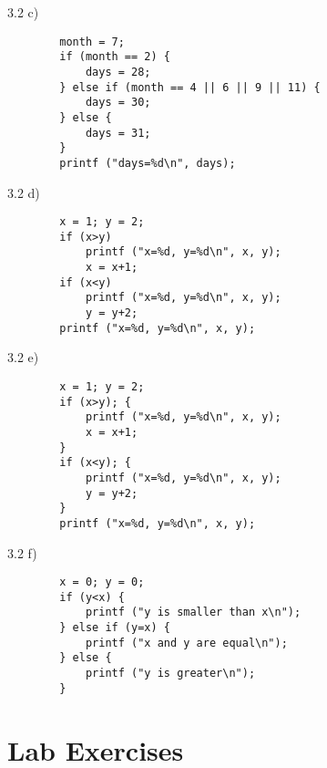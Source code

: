 \documentclass{beamer}
\begin{document}
\begin{frame}[fragile]{3.2 c)}
    \begin{verbatim}
        month = 7;
        if (month == 2) {
            days = 28;
        } else if (month == 4 || 6 || 9 || 11) {
            days = 30;
        } else {
            days = 31;
        }
        printf ("days=%d\n", days);
    \end{verbatim}
\end{frame}

\begin{frame}[fragile]{3.2 d)}
    \begin{verbatim}
        x = 1; y = 2;
        if (x>y)
            printf ("x=%d, y=%d\n", x, y);
            x = x+1;
        if (x<y)
            printf ("x=%d, y=%d\n", x, y);
            y = y+2;
        printf ("x=%d, y=%d\n", x, y);
    \end{verbatim}
\end{frame}

\begin{frame}[fragile]{3.2 e)}
    \begin{verbatim}
        x = 1; y = 2;
        if (x>y); {
            printf ("x=%d, y=%d\n", x, y);
            x = x+1;
        }
        if (x<y); {
            printf ("x=%d, y=%d\n", x, y);
            y = y+2;
        }
        printf ("x=%d, y=%d\n", x, y);
    \end{verbatim}
\end{frame}

\begin{frame}[fragile]{3.2 f)}
    \begin{verbatim}
        x = 0; y = 0;
        if (y<x) {
            printf ("y is smaller than x\n");
        } else if (y=x) {
            printf ("x and y are equal\n");
        } else {
            printf ("y is greater\n");
        }
    \end{verbatim}
\end{frame}

\section{Lab Exercises}
\end{document}
